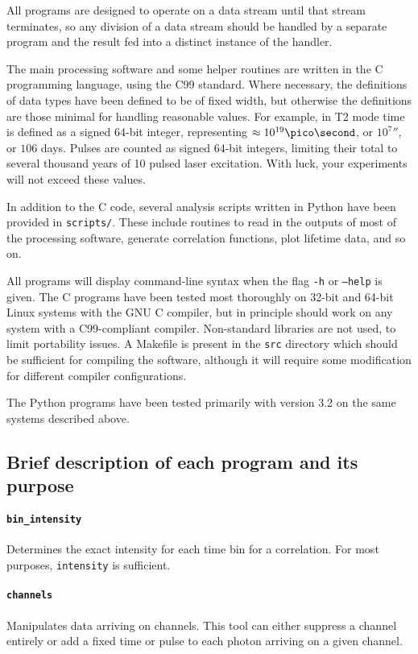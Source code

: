 \documentclass{article}
\newcommand{\program}[1]{\texttt{#1}}
\numberwithin{equation}{section}
\numberwithin{figure}{section}
\begin{document}
All programs are designed to operate on a data stream until that stream terminates, so any division of a data stream should be handled by a separate program and the result fed into a distinct instance of the handler. 

The main processing software and some helper routines are written in the C programming language, using the C99 standard. Where necessary, the definitions of data types have been defined to be of fixed width, but otherwise the definitions are those minimal for handling reasonable values. For example, in T2 mode time is defined as a signed 64-bit integer, representing $\approx 10^{19}\pico\second$, or $10^{7}\second$, or $106$ days. Pulses are counted as signed 64-bit integers, limiting their total to several thousand years of 10\mega\hertz{} pulsed laser excitation. With luck, your experiments will not exceed these values. 

In addition to the C code, several analysis scripts written in Python have been provided in \texttt{scripts/}. These include routines to read in the outputs of most of the processing software, generate correlation functions, plot lifetime data, and so on. 

All programs will display command-line syntax when the flag \texttt{-h} or \texttt{--help} is given. The C programs have been tested most thoroughly on 32-bit and 64-bit Linux systems with the GNU C compiler, but in principle should work on any system with a C99-compliant compiler. Non-standard libraries are not used, to limit portability issues. A Makefile is present in the \texttt{src} directory which should be sufficient for compiling the software, although it will require some modification for different compiler configurations.

The Python programs have been tested primarily with version 3.2 on the same systems described above.

\subsection{Brief description of each program and its purpose}
\paragraph{\program{bin\_intensity}}
Determines the exact intensity for each time bin for a correlation. For most purposes, \program{intensity} is sufficient.

\paragraph{\program{channels}}
Manipulates data arriving on channels. This tool can either suppress a channel entirely or add a fixed time or pulse to each photon arriving on a given channel.
\end{document}
